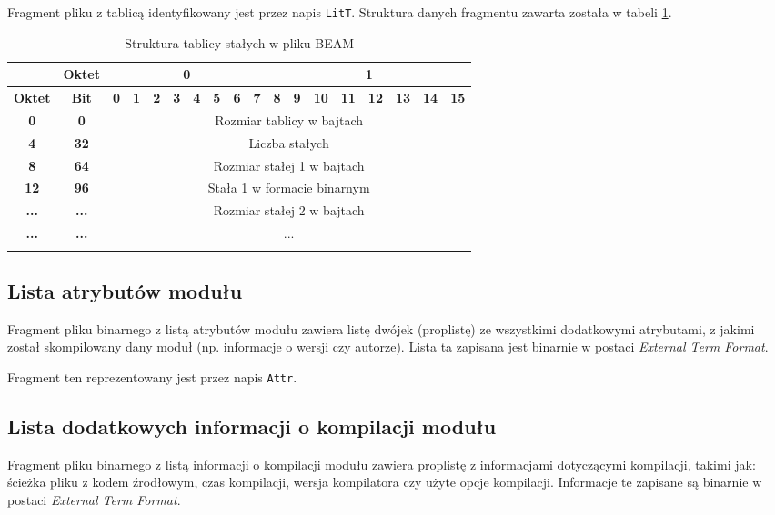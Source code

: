 Fragment pliku z tablicą identyfikowany jest przez napis \texttt{LitT}. Struktura danych fragmentu zawarta została w tabeli \ref{table:literaltable}.

\begin{longtable}{|c|c|c|c|c|c|c|c|c|c|c|c|c|c|c|c|c|c|}
\hline
         & \textbf{Oktet} & \multicolumn{8}{|c|}{\textbf{0}} & \multicolumn{8}{|c|}{\textbf{1}} \\
\hline
\textbf{Oktet} & \textbf{Bit} & \textbf{0} & \textbf{1} & \textbf{2} & \textbf{3} & \textbf{4} & \textbf{5} & \textbf{6} & \textbf{7} & \textbf{8} & \textbf{9} & \textbf{10} & \textbf{11} & \textbf{12} & \textbf{13} & \textbf{14} & \textbf{15}\\
\hline
\textbf{0} & \textbf{0} & \multicolumn{16}{|c|}{Rozmiar tablicy w bajtach} \\[3ex]
\hline
\textbf{4} & \textbf{32} & \multicolumn{16}{|c|}{Liczba stałych}\\[3ex]
\hline
\textbf{8} & \textbf{64} & \multicolumn{16}{|c|}{Rozmiar stałej 1 w bajtach} \\[3ex]
\hline
\textbf{12} & \textbf{96} & \multicolumn{16}{|c|}{Stała 1 w formacie binarnym}\\[6ex]
\hline
\textbf{...} & \textbf{...} & \multicolumn{16}{|c|}{Rozmiar stałej 2 w bajtach}\\[3ex]
\hline
\textbf{...} & \textbf{...} & \multicolumn{16}{|c|}{...}\\[6ex]
\hline
\caption{Struktura tablicy stałych w pliku BEAM}
\label{table:literaltable} \\
\end{longtable}

\subsection{Lista atrybutów modułu}
Fragment pliku binarnego z listą atrybutów modułu zawiera listę dwójek (proplistę) ze wszystkimi dodatkowymi atrybutami, z jakimi został skompilowany dany moduł (np. informacje o wersji czy autorze). Lista ta zapisana jest binarnie w postaci \emph{External Term Format}.

Fragment ten reprezentowany jest przez napis \texttt{Attr}.

\subsection{Lista dodatkowych informacji o kompilacji modułu}
Fragment pliku binarnego z listą informacji o kompilacji modułu zawiera proplistę z informacjami dotyczącymi kompilacji, takimi jak: ścieżka pliku z kodem źrodłowym, czas kompilacji, wersja kompilatora czy użyte opcje kompilacji. Informacje te zapisane są binarnie w postaci \emph{External Term Format}.

